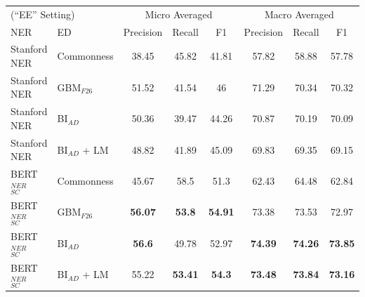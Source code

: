 \documentclass{report}
\theoremstyle{definition}
\theoremstyle{remark}
\begin{document}
\begin{table}[H]
    \vspace{0.5cm}\begin{tabular}{l l c c c| c c c}
    \multicolumn{2}{l}{(``EE'' Setting)}&\multicolumn{3}{c|}{Micro Averaged}&\multicolumn{3}{c}{Macro Averaged} \\
    NER & ED &Precision&Recall&F1&Precision&Recall&F1\\
    \hline
    Stanford NER & Commonness & 38.45&	45.82&41.81&	57.82&58.88&	57.78\\
   Stanford NER & GBM$_{F26}$ &51.52&	41.54&46	 & 71.29&70.34  & 70.32 \\
    Stanford NER & BI$_{AD}$ &50.36&	39.47&44.26&	70.87&70.19&	70.09\\
    Stanford NER & BI$_{AD}$ + LM&48.82&41.89&45.09&69.83&69.35&69.15\\
    BERT$_{SC}^{NER}$ & Commonness & 45.67&	58.5&51.3&	62.43&64.48&	62.84\\
    BERT$_{SC}^{NER}$ & GBM$_{F26}$ &\textbf{56.07}&	\textbf{53.8}&\textbf{54.91}&	73.38&73.53&	72.97 \\
    BERT$_{SC}^{NER}$ & BI$_{AD}$ &\textbf{56.6}&	49.78&52.97&	\textbf{74.39}&\textbf{74.26}&	\textbf{73.85}\\
    BERT$_{SC}^{NER}$ & BI$_{AD}$ + LM & 55.22&\textbf{53.41}&\textbf{54.3}&\textbf{73.48}&\textbf{73.84}&\textbf{73.16}\\
    \end{tabular}
    

\end{table}
\end{document}

